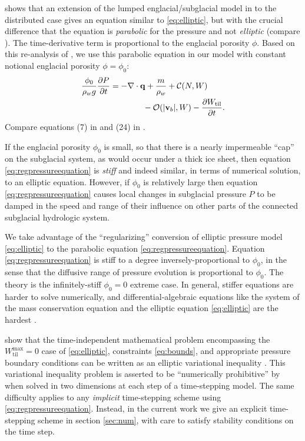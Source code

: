 \documentclass[gmd]{copernicus}   %
\newcommand{\text}{\textrm}
\newcommand\bv{\mathbf{v}}
\newcommand\bq{\mathbf{q}}
\newcommand{\ddt}[1]{\ensuremath{\frac{\partial #1}{\partial t}}}
\newcommand{\Div}{\nabla\cdot}
\newcommand{\Wtil}{W_{\text{til}}}
\newcommand{\Wtilmax}{W_{\text{til}}^{\text{max}}}
\begin{document}
\cite{Bueler2014correspondence} shows that an extension of the lumped englacial/subglacial model in \cite{Bartholomausetal2011} to the distributed case gives an equation similar to \eqref{eq:elliptic}, but with the crucial difference that the equation is \emph{parabolic} for the pressure and not \emph{elliptic} (compare \cite{Hewittetal2012}).  The time-derivative term is proportional to the englacial porosity $\phi$.  Based on this re-analysis of \cite{Bartholomausetal2011}, we use this parabolic equation in our model with constant notional englacial porosity $\phi=\phi_0$:
\begin{align}
\frac{\phi_0}{\rho_w g} \ddt{P} &= - \Div \bq + \frac{m}{\rho_w} + \mathcal{C}(N,W)  \label{eq:regpressureequation} \\
  &\qquad\qquad - \mathcal{O}(|\bv_b|,W) - \ddt{\Wtil}. \notag
\end{align}
Compare equations (7) in \cite{Hewitt2013} and (24) in \cite{Werderetal2013}.

If the englacial porosity $\phi_0$ is small, so that there is a nearly impermeable ``cap'' on the subglacial system, as would occur under a thick ice sheet, then equation \eqref{eq:regpressureequation} is \emph{stiff} and indeed similar, in terms of numerical solution, to an elliptic equation.  However, if $\phi_0$ is relatively large then equation \eqref{eq:regpressureequation} causes local changes in subglacial pressure $P$ to be damped in the speed and range of their influence on other parts of the connected subglacial hydrologic system.

We take advantage of the ``regularizing'' conversion of elliptic pressure model \eqref{eq:elliptic} to the parabolic equation \eqref{eq:regpressureequation}.  Equation \eqref{eq:regpressureequation} is stiff to a degree inversely-proportional to $\phi_0$, in the sense that the diffusive range of pressure evolution is proportional to $\phi_0$.  The \cite{Schoofetal2012} theory is the infinitely-stiff $\phi_0=0$ extreme case.  In general, stiffer equations are harder to solve numerically, and differential-algebraic equations like the system of the mass conservation equation and the elliptic equation \eqref{eq:elliptic} are the hardest \citep{AscherPetzold}.

\cite{Schoofetal2012} show that the time-independent mathematical problem encompassing the $\Wtilmax=0$ case of \eqref{eq:elliptic}, constraints \eqref{eq:bounds}, and appropriate pressure boundary conditions can be written as an elliptic variational inequality \citep{KinderlehrerStampacchia}.  This variational inequality problem is asserted to be ``numerically prohibitive'' by \cite{Werderetal2013} when solved in two dimensions at each step of a time-stepping model.  The same difficulty applies to any \emph{implicit} time-stepping scheme using \eqref{eq:regpressureequation}.  Instead, in the current work we give an explicit time-stepping scheme in section \ref{sec:num}, with care to satisfy stability conditions on the time step.
\end{document}
